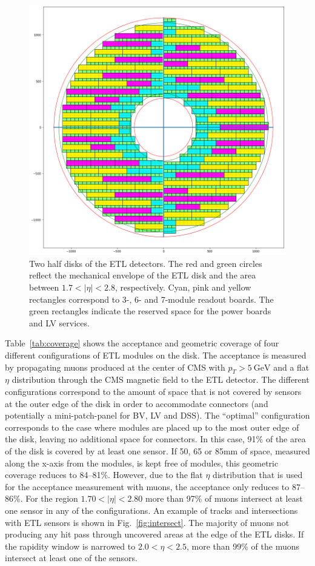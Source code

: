 \documentclass[11pt]{article}
\begin{document}
\begin{figure}[!ht]
\centering
\includegraphics[width=0.60 \textwidth]{figures/coverage_both.png}
\caption{
Two half disks of the ETL detectors.
The red and green circles reflect the mechanical envelope of the ETL disk and the area between $1.7<|\eta|<2.8$, respectively.
Cyan, pink and yellow rectangles correspond to 3-, 6- and 7-module readout boards.
The green rectangles indicate the reserved space for the power boards and LV services.
}
\label{fig:coverage_both}
\end{figure}

Table~\ref{tab:coverage} shows the acceptance and geometric coverage of four different configurations of ETL modules on the disk.
The acceptance is measured by propagating muons produced at the center of CMS with $p_{T}>5~\mathrm{GeV}$ and a flat $\eta$ distribution through the CMS magnetic field to the ETL detector.
The different configurations correspond to the amount of space that is not covered by sensors at the outer edge of the disk in order to accommodate connectors (and potentially a mini-patch-panel for BV, LV and DSS).
The ``optimal'' configuration corresponds to the case where modules are placed up to the most outer edge of the disk, leaving no additional space for connectors.
In this case, 91\% of the area of the disk is covered by at least one sensor.
If 50, 65 or 85mm of space, measured along the x-axis from the modules, is kept free of modules, this geometric coverage reduces to 84--81\%.
However, due to the flat $\eta$ distribution that is used for the acceptance measurement with muons, the acceptance only reduces to 87--86\%.
For the region $1.70<|\eta|<2.80$ more than 97\% of muons intersect at least one sensor in any of the configurations.
An example of tracks and intersections with ETL sensors is shown in Fig.~\ref{fig:intersect}.
The majority of muons not producing any hit pass through uncovered areas at the edge of the ETL disks.
If the rapidity window is narrowed to $2.0<\eta<2.5$, more than 99\% of the muons intersect at least one of the sensors.
\end{document}
